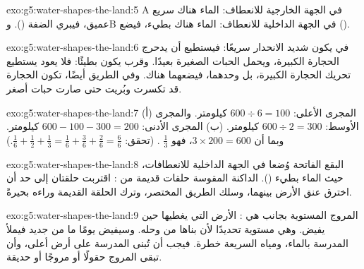 \begin{solution}{exo:g5:water-shapes-the-land:5}
A في الجهة الخارجية للانعطاف: الماء هناك سريع عميق، فيبري
الضفة (). وB في الجهة الداخلية للانعطاف: الماء
هناك بطيء، فيضع  ().
\end{solution}

\begin{solution}{exo:g5:water-shapes-the-land:6}
في  يكون  شديد الانحدار سريعًا: فيستطيع أن يدحرج الحجارة الكبيرة،
ويحمل الحبات الصغيرة بعيدًا. وقرب  يكون  بطيئًا:
فلا يعود يستطيع تحريك الحجارة الكبيرة، بل   وحدهما، فيضعهما
هناك. وفي الطريق أيضًا، تكون الحجارة قد تكسرت وبُريت حتى صارت حبات
أصغر.
\end{solution}

\begin{solution}{exo:g5:water-shapes-the-land:7}
(أ) المجرى الأعلى: $600 \div 6 = 100$ كيلومتر. والمجرى الأوسط:
$600 \div 2 = 300$ كيلومتر. (ب) المجرى الأدنى: $600 - 100 - 300 = 200$
كيلومتر. وبما أن $3 \times 200 = 600$، فهو $\frac{1}{3}$ .
(تحقق: $\frac{1}{6} + \frac{1}{2} + \frac{1}{3} = \frac{1}{6} +
\frac{3}{6} + \frac{2}{6} = \frac{6}{6}$.)
\end{solution}

\begin{solution}{exo:g5:water-shapes-the-land:8}
البقع الفاتحة   وُضعا في الجهة الداخلية للانعطافات،
حيث الماء بطيء ().  الداكنة المقوسة حلقات قديمة
من : اقتربت حلقتان إلى حد أن  اخترق عنق
الأرض بينهما، وسلك الطريق المختصر، وترك الحلقة القديمة وراءه
بحيرةً.
\end{solution}

\begin{solution}{exo:g5:water-shapes-the-land:9}
المروج المستوية بجانب  هي : الأرض التي يغطيها 
حين يفيض. وهي مستوية تحديدًا لأن  بناها
من وحله. وسيفيض  يومًا ما من جديد فيملأ المدرسة
بالماء، ومياه  السريعة خطرة. فيجب أن تُبنى المدرسة
على أرض أعلى، وأن تبقى المروج حقولًا أو مروجًا أو حديقة.
\end{solution}

